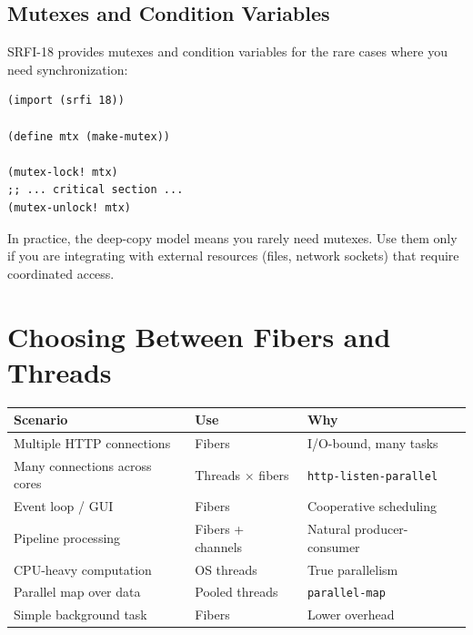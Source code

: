 \subsection{Mutexes and Condition Variables}

SRFI-18 provides mutexes and condition variables for the rare cases where you need synchronization:

\begin{lstlisting}
(import (srfi 18))

(define mtx (make-mutex))

(mutex-lock! mtx)
;; ... critical section ...
(mutex-unlock! mtx)
\end{lstlisting}

In practice, the deep-copy model means you rarely need mutexes. Use them only if you are integrating with external resources (files, network sockets) that require coordinated access.

\section{Choosing Between Fibers and Threads}

\begin{center}
\begin{tabular}{llp{3.2cm}}
\textbf{Scenario} & \textbf{Use} & \textbf{Why} \\
\hline
Multiple HTTP connections & Fibers & I/O-bound, many tasks \\
Many connections across cores & Threads $\times$ fibers & \texttt{http-listen-}\allowbreak\texttt{parallel} \\
Event loop / GUI & Fibers & Cooperative scheduling \\
Pipeline processing & Fibers + channels & Natural producer-consumer \\
CPU-heavy computation & OS threads & True parallelism \\
Parallel map over data & Pooled threads & \texttt{parallel-map} \\
Simple background task & Fibers & Lower overhead \\
\end{tabular}
\end{center}

